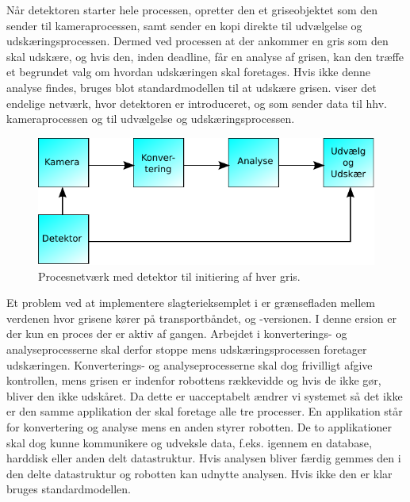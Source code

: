Når detektoren starter hele processen, opretter den et griseobjektet som den sender til kameraprocessen, samt sender en kopi direkte til udvælgelse og udskæringsprocessen. Dermed ved processen at der ankommer en gris som den skal udskære, og hvis den, inden deadline, får en analyse af grisen, kan den træffe et begrundet valg om hvordan udskæringen skal foretages. Hvis ikke denne analyse findes, bruges blot standardmodellen til at udskære grisen.  viser det endelige  netværk, hvor detektoren er introduceret, og som sender data til hhv. kameraprocessen og til udvælgelse og udskæringsprocessen. 

\begin{figure}
 \begin{center}
  \includegraphics[scale=1]{images/pig-network2}
	\caption{Procesnetværk med detektor til initiering af hver gris.}
	\label{fig:pig-network2}
\end{center}
\end{figure}

Et problem ved at implementere slagterieksemplet i \pycsp er  grænsefladen mellem verdenen hvor grisene kører på transportbåndet, og  -versionen.  I denne ersion er der kun  en proces  der er aktiv af gangen. Arbejdet i  konverterings- og analyseprocesserne skal derfor stoppe  mens  udskæringsprocessen foretager udskæringen.  Konverterings- og analyseprocesserne  skal dog frivilligt afgive kontrollen, mens grisen er indenfor robottens rækkevidde og hvis de ikke gør, bliver den ikke udskåret. Da dette er uacceptabelt ændrer vi systemet så det ikke er den samme applikation der skal foretage alle tre processer. En applikation står for konvertering og analyse mens en anden  styrer robotten. De to applikationer skal dog kunne kommunikere og  udveksle data, f.eks. igennem en database, harddisk eller anden delt datastruktur. Hvis analysen bliver færdig gemmes den i den delte datastruktur og robotten kan udnytte analysen. Hvis ikke den er klar bruges standardmodellen.    

